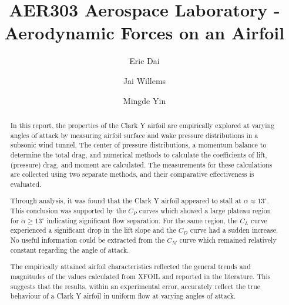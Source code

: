 \documentclass[runningheads]{llncs}
\begin{document}
\title{AER303 Aerospace Laboratory - Aerodynamic Forces on an Airfoil}

\author{Eric Dai \and Jai Willems \and Mingde Yin}


\maketitle




\begin{abstract}

In this report, the properties of the Clark Y airfoil are empirically explored at varying angles of attack by measuring airfoil surface and wake pressure distributions in a subsonic wind tunnel. The center of pressure distributions, a momentum balance to determine the total drag, and numerical methods to calculate the coefficients of lift, (pressure) drag, and moment are calculated. The measurements for these calculations are collected using two separate methods, and their comparative effectiveness is evaluated.\newline

Through analysis, it was found that the Clark Y airfoil appeared to stall at $\alpha\approx 13^\circ$. This conclusion was supported by the $C_P$ curves which showed a large plateau region for $\alpha\geq13^\circ$ indicating significant flow separation. For the same region, the $C_L$ curve experienced a significant drop in the lift slope and the $C_D$ curve had a sudden increase. No useful information could be extracted from the $C_M$ curve which remained relatively constant regarding the angle of attack.\newline

The empirically attained airfoil characteristics reflected the general trends and magnitudes of the values calculated from XFOIL and reported in the literature. This suggests that the results, within an experimental error, accurately reflect the true behaviour of a Clark Y airfoil in uniform flow at varying angles of attack.

\end{abstract}
\end{document}
